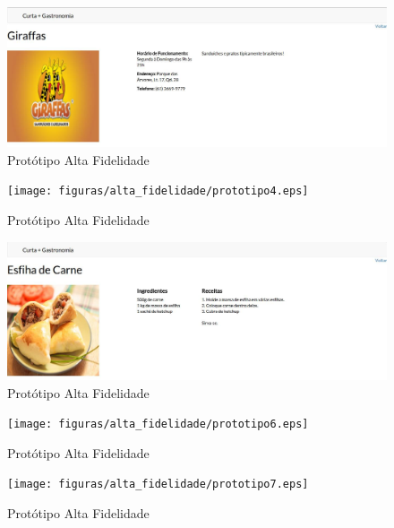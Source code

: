 \begin{figure}[H]
	\begin{center}
		\includegraphics[keepaspectratio,scale=0.3]{figuras/alta_fidelidade/prototipo3.eps}
		\caption{Protótipo Alta Fidelidade}
	\end{center}
\end{figure}

\begin{figure}[H]
	\begin{center}
		\texttt{[image: figuras/alta\_fidelidade/prototipo4.eps]}
		\caption{Protótipo Alta Fidelidade}
	\end{center}
\end{figure}

\begin{figure}[H]
	\begin{center}
		\includegraphics[keepaspectratio,scale=0.3]{figuras/alta_fidelidade/prototipo5.eps}
		\caption{Protótipo Alta Fidelidade}
	\end{center}
\end{figure}

\begin{figure}[H]
	\begin{center}
		\texttt{[image: figuras/alta\_fidelidade/prototipo6.eps]}
		\caption{Protótipo Alta Fidelidade}
	\end{center}
\end{figure}

\begin{figure}[H]
	\begin{center}
		\texttt{[image: figuras/alta\_fidelidade/prototipo7.eps]}
		\caption{Protótipo Alta Fidelidade}
	\end{center}
\end{figure}

